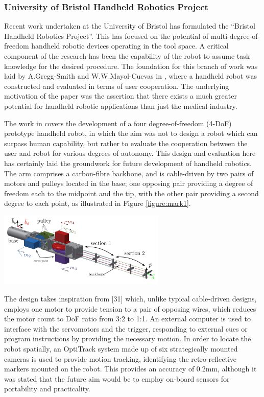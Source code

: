 \documentclass[11pt]{article}
\begin{document}
\subsubsection{University of Bristol Handheld Robotics Project} \label{bristolhandheld}
Recent work undertaken at the University of Bristol has formulated the “Bristol Handheld Robotics Project”. This has focused on the potential of multi-degree-of-freedom handheld robotic devices operating in the tool space. A critical component of the research has been the capability of the robot to assume task knowledge for the desired procedure. The foundation for this branch of work was laid by A.Gregg-Smith and W.W.Mayol-Cuevas in \cite{GreggSmithDesign}, where a handheld robot was constructed and evaluated in terms of user cooperation. The underlying motivation of the paper was the assertion that there exists a much greater potential for handheld robotic applications than just the medical industry.

The work in \cite{GreggSmithDesign} covers the development of a four degree-of-freedom (4-DoF) prototype handheld robot, in which the aim was not to design a robot which can surpass human capability, but rather to evaluate the cooperation between the user and robot for various degrees of autonomy. This design and evaluation here has certainly laid the groundwork for future development of handheld robotics. The arm comprises a carbon-fibre backbone, and is cable-driven by two pairs of motors and pulleys located in the base; one opposing pair providing a degree of freedom each to the midpoint and the tip, with the other pair providing a second degree to each point, as illustrated in Figure \ref{figure:mark1}.


\begin{center}
\includegraphics[width = 0.6\textwidth]{images/mark1.png}
\label{figure:mark1}
\end{center}

The design takes inspiration from [31] which, unlike typical cable-driven designs, employs one motor
to provide tension to a pair of opposing wires, which reduces the motor count to DoF ratio from 3:2 to 1:1. 
An external computer is used to interface with the servomotors and the trigger, responding to external
cues or program instructions by providing the necessary motion. In order to locate the robot spatially, an OptiTrack system made up of six strategically mounted cameras is
used to provide motion tracking, identifying the retro-reflective markers mounted on the robot. This
provides an accuracy of 0.2mm, although it was stated that the future aim would be to employ
on-board sensors for portability and practicality.
\end{document}
